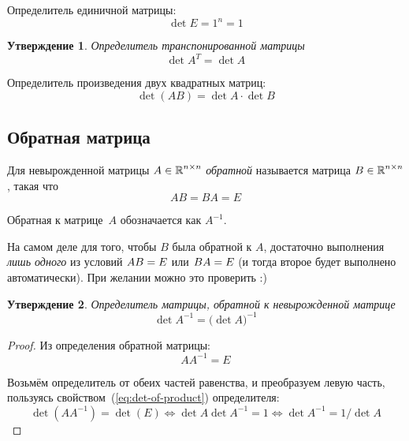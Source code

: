 \documentclass[a4paper,12pt]{article}
\newtheorem{proposition}{Утверждение}[section]
\theoremstyle{remark}
\begin{document}
  \begin{example}
    Определитель единичной матрицы:
    \[
      \det E = 1^n = 1
    \]
  \end{example}
  
  \begin{proposition}
    Определитель транспонированной матрицы
    \[
      \det A^T = \det A
    \]
  \end{proposition}
  
  \begin{theorem}
    Определитель произведения двух квадратных матриц:
    \begin{equation}\label{eq:det-of-product}
      \det (AB) = \det A \cdot \det B
    \end{equation}
  \end{theorem}
  
  
  \subsection{Обратная матрица}
  
  \begin{definition}
    Для невырожденной матрицы $A \hm\in \RR^{n\times n}$ \emph{обратной} называется матрица $B \hm\in \RR^{n\times n}$, такая что
    \[
      AB = BA = E
    \]
    
    Обратная к матрице~$A$ обозначается как $A^{-1}$.
  \end{definition}
  
  \begin{remark}
    На самом деле для того, чтобы $B$ была обратной к $A$, достаточно выполнения \emph{лишь одного} из условий $AB \hm= E$ или $BA \hm= E$ (и тогда второе будет выполнено автоматически).
    При желании можно это проверить :)
  \end{remark}
  
  \begin{proposition}
    Определитель матрицы, обратной к \emph{невырожденной} матрице
    \[
      \det A^{-1} = \bigl(\det A\bigl)^{-1}
    \]
  \end{proposition}
  
  \begin{proof}
    Из определения обратной матрицы:
    \[
      A A^{-1} = E
    \]
    
    Возьмём определитель от обеих частей равенства, и преобразуем левую часть, пользуясь свойством~(\ref{eq:det-of-product}) определителя:
    \[
      \det\left(A A^{-1}\right) = \det(E)
        \Leftrightarrow \det A \det A^{-1} = 1
        \Leftrightarrow \det A^{-1} = 1 / \det A
    \]
  \end{proof}
  
\end{document}
